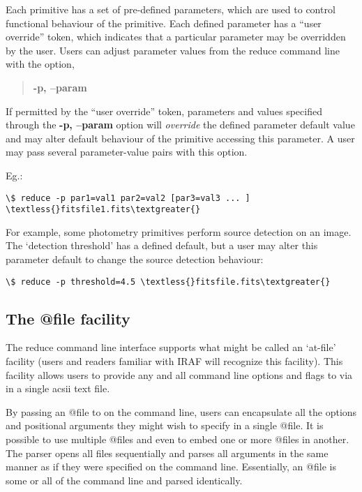 \documentclass[letterpaper,10pt,english]{sphinxmanual}
\begin{document}
Each primitive has a set of pre-defined parameters, which are used to control
functional behaviour of the primitive. Each defined parameter has a ``user
override'' token, which indicates that a particular parameter may be overridden
by the user. Users can adjust parameter values from the reduce command line with
the option,
\begin{quote}

\textbf{-p, --param}
\end{quote}

If permitted by the ``user override'' token, parameters and values specified
through the \textbf{-p, --param} option will \emph{override} the defined
parameter default value and may alter default behaviour of the primitive
accessing this parameter. A user may pass several parameter-value pairs with this
option.

Eg.:

\begin{Verbatim}[commandchars=\\\{\}]
\$ reduce -p par1=val1 par2=val2 [par3=val3 ... ] \textless{}fitsfile1.fits\textgreater{}
\end{Verbatim}

For example, some photometry primitives perform source detection on an image. The
`detection threshold' has a defined default, but a user may alter this parameter
default to change the source detection behaviour:

\begin{Verbatim}[commandchars=\\\{\}]
\$ reduce -p threshold=4.5 \textless{}fitsfile.fits\textgreater{}
\end{Verbatim}


\subsection{The @file facility}
\label{interfaces:the-file-facility}\label{interfaces:atfile}
The reduce command line interface supports what might be called an `at-file'
facility (users and readers familiar with IRAF will recognize this facility). This
facility allows users to provide any and all command line options and flags
to  via in a single acsii text file.

By passing an @file to  on the command line, users can encapsulate all
the options and positional arguments they might wish to specify in a single
@file. It is possible to use multiple @files and even to embed one or more
@files in another. The parser opens all files sequentially and parses
all arguments in the same manner as if they were specified on the command line.
Essentially, an @file is some or all of the command line and parsed identically.
\end{document}
